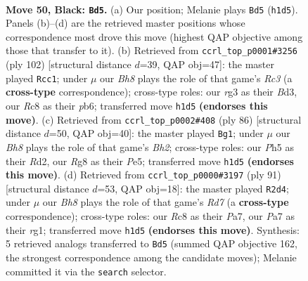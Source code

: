 \documentclass[11pt]{article}
\begin{document}
\clearpage

\begin{figure}[p]\centering
\begin{subfigure}{0.46\textwidth}\centering
\resizebox{\linewidth}{!}{%
\newchessgame
\chessboard[
  setfen={2r3r1/p1p1k3/P1p3p1/2P2p1p/1P3P1P/6R1/5K2/RN5b b - - 23 50},
  showmover=false,
  pgfstyle=straightmove, color=movearrow, markmove={h1-d5}
]}
\caption{}
\end{subfigure}\hfill
\begin{subfigure}{0.46\textwidth}\centering
\resizebox{\linewidth}{!}{%
\newchessgame
\chessboard[
  setfen={5r2/3k4/1p1nr1p1/p2p2Pp/P4P1P/1PRB4/1K6/5R2 w - - 8 52},
  showmover=false,
  pgfstyle=straightmove, color=movearrow, markmove={c3-c1}
]}
\caption{}
\end{subfigure}
\\[4pt]
\begin{subfigure}{0.46\textwidth}\centering
\resizebox{\linewidth}{!}{%
\newchessgame
\chessboard[
  setfen={2r2n2/p5k1/3P4/1pp1P1p1/6Pp/1KP2r2/P2R3B/3R4 w - - 0 44},
  showmover=false,
  pgfstyle=straightmove, color=movearrow, markmove={h2-g1}
]}
\caption{}
\end{subfigure}\hfill
\begin{subfigure}{0.46\textwidth}\centering
\resizebox{\linewidth}{!}{%
\newchessgame
\chessboard[
  setfen={k7/p7/3r1pp1/4p2p/1P2P2P/P5P1/3r4/K4RR1 b - - 2 46},
  showmover=false,
  pgfstyle=straightmove, color=movearrow, markmove={d2-d4}
]}
\caption{}
\end{subfigure}
\caption{\textbf{Move 50, Black: \texttt{Bd5}.} (a) Our position; Melanie plays \texttt{Bd5} (\texttt{h1d5}). Panels (b)--(d) are the retrieved master positions whose correspondence most drove this move (highest QAP objective among those that transfer to it). (b) Retrieved from \texttt{ccrl\_top\_p0001\#3256} (ply 102) [structural distance $d$=39, QAP obj=47]: the master played \texttt{Rcc1}; under $\mu$ our \emph{Bh8} plays the role of that game's \emph{Rc3} (a \textbf{cross-type} correspondence); cross-type roles: our \emph{r}g3 as their \emph{B}d3, our \emph{R}c8 as their \emph{p}b6; transferred move \texttt{h1d5} \textbf{(endorses this move)}. (c) Retrieved from \texttt{ccrl\_top\_p0002\#408} (ply 86) [structural distance $d$=50, QAP obj=40]: the master played \texttt{Bg1}; under $\mu$ our \emph{Bh8} plays the role of that game's \emph{Bh2}; cross-type roles: our \emph{P}h5 as their \emph{R}d2, our \emph{R}g8 as their \emph{P}e5; transferred move \texttt{h1d5} \textbf{(endorses this move)}. (d) Retrieved from \texttt{ccrl\_top\_p0000\#3197} (ply 91) [structural distance $d$=53, QAP obj=18]: the master played \texttt{R2d4}; under $\mu$ our \emph{Bh8} plays the role of that game's \emph{Rd7} (a \textbf{cross-type} correspondence); cross-type roles: our \emph{R}c8 as their \emph{P}a7, our \emph{P}a7 as their \emph{r}g1; transferred move \texttt{h1d5} \textbf{(endorses this move)}. Synthesis: 5 retrieved analogs transferred to \texttt{Bd5} (summed QAP objective 162, the strongest correspondence among the candidate moves); Melanie committed it via the \texttt{search} selector.}
\label{fig:thought-m99}
\end{figure}
\end{document}
